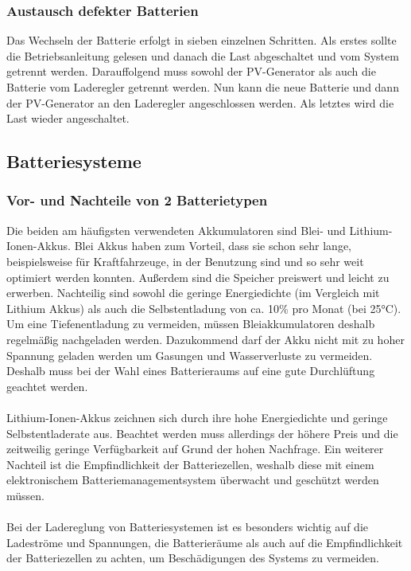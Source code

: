 \subsubsection{Austausch defekter Batterien}
Das Wechseln der Batterie erfolgt in sieben einzelnen Schritten. Als erstes sollte die Betriebsanleitung gelesen und danach die Last abgeschaltet und vom System getrennt werden. Darauffolgend muss sowohl der PV-Generator als auch die Batterie vom Laderegler getrennt werden. Nun kann die neue Batterie und dann der PV-Generator an den Laderegler angeschlossen werden. Als letztes wird die Last wieder angeschaltet.
\newpage
\subsection{Batteriesysteme}
\subsubsection{Vor- und Nachteile von 2 Batterietypen}
Die beiden am häufigsten verwendeten Akkumulatoren sind Blei- und Lithium-Ionen-Akkus.
Blei Akkus haben zum Vorteil, dass sie schon sehr lange, beispielsweise für Kraftfahrzeuge, in der Benutzung sind und so sehr weit optimiert werden konnten. Außerdem sind die Speicher preiswert und leicht zu erwerben. Nachteilig sind sowohl die geringe Energiedichte (im Vergleich mit Lithium Akkus) als auch die Selbstentladung von ca. 10\% pro Monat (bei 25°C). Um eine Tiefenentladung zu vermeiden, müssen Bleiakkumulatoren deshalb regelmäßig nachgeladen werden. Dazukommend darf der Akku nicht mit zu hoher Spannung geladen werden um Gasungen und Wasserverluste zu vermeiden. Deshalb muss bei der Wahl eines Batterieraums auf eine gute Durchlüftung geachtet werden.\\\\
Lithium-Ionen-Akkus zeichnen sich durch ihre hohe Energiedichte und geringe Selbstentladerate aus. Beachtet werden muss allerdings der höhere Preis und die zeitweilig geringe Verfügbarkeit auf Grund der hohen Nachfrage. Ein weiterer Nachteil ist die Empfindlichkeit der Batteriezellen, weshalb diese mit einem elektronischem Batteriemanagementsystem überwacht und geschützt werden müssen.\\\\
Bei der Ladereglung von Batteriesystemen ist es besonders wichtig auf die Ladeströme und Spannungen, die Batterieräume als auch auf die Empfindlichkeit der Batteriezellen zu achten, um Beschädigungen des Systems zu vermeiden.

